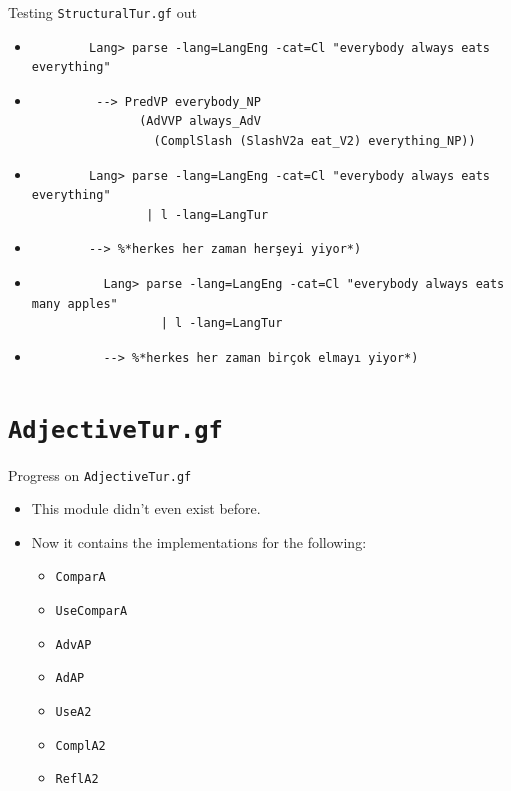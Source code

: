 \documentclass{beamer}
\begin{document}
  \begin{frame}[fragile]{Testing \texttt{StructuralTur.gf} out}
    \begin{itemize}
      \item<1->
        \begin{lstlisting}
        Lang> parse -lang=LangEng -cat=Cl "everybody always eats everything"
        \end{lstlisting}
      \item<2->
        \begin{lstlisting}
         --> PredVP everybody_NP
               (AdVVP always_AdV
                 (ComplSlash (SlashV2a eat_V2) everything_NP))
        \end{lstlisting}
      \item<3->
        \begin{lstlisting}
        Lang> parse -lang=LangEng -cat=Cl "everybody always eats everything"
                | l -lang=LangTur
        \end{lstlisting}
      \item<4->
        \begin{lstlisting}
        --> %*herkes her zaman herşeyi yiyor*)
        \end{lstlisting}
      \item<5->
        \begin{lstlisting}
          Lang> parse -lang=LangEng -cat=Cl "everybody always eats many apples"
                  | l -lang=LangTur
        \end{lstlisting}
      \item<6->
        \begin{lstlisting}
          --> %*herkes her zaman birçok elmayı yiyor*)
        \end{lstlisting}
    \end{itemize}
  \end{frame}

  \section{\texttt{AdjectiveTur.gf}}

  \begin{frame}{Progress on \texttt{AdjectiveTur.gf}}
    \begin{itemize}
      \item<1-> This module didn't even exist before.
      \item<2-> Now it contains the implementations for the following:
        \begin{itemize}
          \item \texttt{ComparA}
          \item \texttt{UseComparA}
          \item \texttt{AdvAP}
          \item \texttt{AdAP}
          \item \texttt{UseA2}
          \item \texttt{ComplA2}
          \item \texttt{ReflA2}
        \end{itemize}
    \end{itemize}
  \end{frame}
\end{document}
